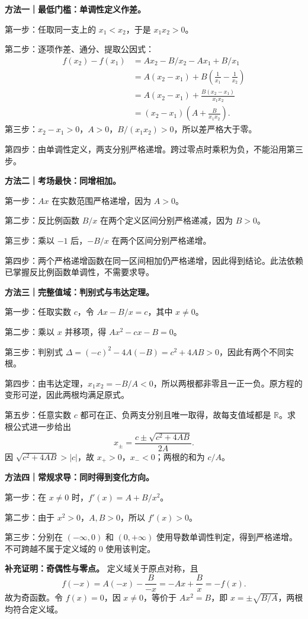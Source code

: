 \clearpage
\begin{proofbox}
\textbf{方法一｜最低门槛：单调性定义作差。}

第一步：任取同一支上的 $x_1<x_2$，于是 $x_1x_2>0$。

第二步：逐项作差、通分、提取公因式：
\[
\begin{aligned}f(x_2)-f(x_1)
&=Ax_2-B/x_2-Ax_1+B/x_1\\
&=A(x_2-x_1)+B\left(\frac1{x_1}-\frac1{x_2}\right)\\
&=A(x_2-x_1)+\frac{B(x_2-x_1)}{x_1x_2}\\
&=(x_2-x_1)\left(A+\frac B{x_1x_2}\right).
\end{aligned}
\]
第三步：$x_2-x_1>0$，$A>0$，$B/(x_1x_2)>0$，所以差严格大于零。

第四步：由单调性定义，两支分别严格递增。跨过零点时乘积为负，不能沿用第三步。
\end{proofbox}
\clearpage
\begin{proofbox}
\textbf{方法二｜考场最快：同增相加。}

第一步：$Ax$ 在实数范围严格递增，因为 $A>0$。

第二步：反比例函数 $B/x$ 在两个定义区间分别严格递减，因为 $B>0$。

第三步：乘以 $-1$ 后，$-B/x$ 在两个区间分别严格递增。

第四步：两个严格递增函数在同一区间相加仍严格递增，因此得到结论。此法依赖已掌握反比例函数单调性，不需要求导。
\end{proofbox}
\clearpage
\begin{proofbox}
\textbf{方法三｜完整值域：判别式与韦达定理。}

第一步：任取实数 $c$，令 $Ax-B/x=c$，其中 $x\ne0$。

第二步：乘以 $x$ 并移项，得 $Ax^2-cx-B=0$。

第三步：判别式 $\Delta=(-c)^2-4A(-B)=c^2+4AB>0$，因此有两个不同实根。

第四步：由韦达定理，$x_1x_2=-B/A<0$，所以两根都非零且一正一负。原方程的变形可逆，因此两根均满足原式。

第五步：任意实数 $c$ 都可在正、负两支分别且唯一取得，故每支值域都是 $\mathbb R$。求根公式进一步给出
\[
 x_\pm=\frac{c\pm\sqrt{c^2+4AB}}{2A}.
\]
因 $\sqrt{c^2+4AB}>|c|$，故 $x_+>0$，$x_-<0$；两根的和为 $c/A$。
\end{proofbox}
\clearpage
\begin{proofbox}
\textbf{方法四｜常规求导：同时得到变化方向。}

第一步：在 $x\ne0$ 时，$f'(x)=A+B/x^2$。

第二步：由于 $x^2>0$，$A,B>0$，所以 $f'(x)>0$。

第三步：分别在 $(-\infty,0)$ 和 $(0,+\infty)$ 使用导数单调性判定，得到严格递增。不可跨越不属于定义域的 $0$ 使用该判定。

\medskip
\textbf{补充证明：奇偶性与零点。}
定义域关于原点对称，且
\[f(-x)=A(-x)-\frac B{-x}=-Ax+\frac Bx=-f(x).\]
故为奇函数。令 $f(x)=0$，因 $x\ne0$，等价于 $Ax^2=B$，即 $x=\pm\sqrt{B/A}$，两根均符合定义域。
\end{proofbox}
